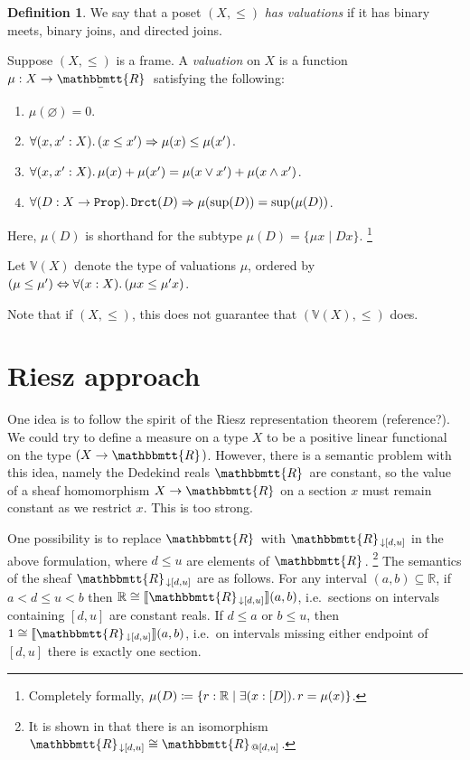 \documentclass[11pt, oneside, article]{memoir}
\makeatletter
\theoremstyle{plain}
\theoremstyle{definition}
\newtheorem{definition}[theorem]{Definition}
\theoremstyle{remark}
\renewcommand{\ss}{\subseteq}
\DeclarePairedDelimiter{\church}{\llbracket}{\rrbracket}
\DeclarePairedDelimiter{\subtype}{[}{]}
\newcommand{\const}[1]{\mathtt{#1}}
\newcommand{\ubar}[1]{\underaccent{\bar}{#1}}
\newcommand{\internal}[1]{\raisebox{-.03ex}{$\mathbbmtt{#1}$}}
\newcommand{\hs}{\hspace{1.1pt}}
\newcommand{\RR}{\mathbb{R}}
\newcommand{\VV}{\mathbb{V}}
\newcommand{\tRR}{\internal{R}\hs}
\newcommand{\tLR}{\ubar{\tRR}\hs}
\newcommand{\tRRat}[1]{\tRR_{\SeeInline{#1}}}
\newcommand{\Prop}{\const{Prop}}
\newcommand{\SeeSymbol}{{\down}}  %
\newcommand{\AtInline}[1]{@{#1}}
\newcommand{\SeeInline}[1]{\SeeSymbol{#1}}
\newcommand{\down}{\mathord{\downarrow}}
\newcommand{\imp}{\Rightarrow}
\renewcommand{\iff}{\Leftrightarrow}
\makeatother
\begin{document}
\begin{definition}
We say that a poset $(X,\leq)$ \emph{has valuations} if it has binary meets, binary joins, and directed joins.

Suppose $(X,\leq)$ is a frame. A \emph{valuation} on $X$ is a function $\mu:X\to\tLR$ satisfying the following:
\begin{enumerate}
	\item $\mu(\varnothing)=0$.
	\item $\forall(x,x':X)\ldotp(x\leq x')\imp\mu(x)\leq\mu(x')$.
	\item $\forall(x,x':X)\ldotp\mu(x)+\mu(x')=\mu(x\vee x')+\mu(x\wedge x')$.
	\item $\forall(D:X\to\Prop)\ldotp\const{Drct}(D)\imp \mu(\sup(D))=\sup(\mu(D))$.
\end{enumerate}
Here, $\mu(D)$ is shorthand for the subtype $\mu(D)=\{\mu x\mid Dx\}$.%
\footnote{Completely formally, $\mu(D)\coloneqq\{r:\RR\mid\exists(x:\subtype{D})\ldotp r=\mu(x)\}$.}

Let $\VV(X)$ denote the type of valuations $\mu$, ordered by $(\mu\leq\mu')\iff\forall(x:X)\ldotp(\mu x\leq \mu'x)$.
\end{definition}

Note that if $(X,\leq)$, this does not guarantee that $(\VV(X),\leq)$ does.

\chapter{Riesz approach}

One idea is to follow the spirit of the Riesz representation theorem (reference?). We could try to define a measure on a type $X$ to be a positive linear functional on the type $(X\to\tRR)$. However, there is a semantic problem with this idea, namely the Dedekind reals $\tRR$ are constant, so the value of a sheaf homomorphism $X\to\tRR$ on a section $x$ must remain constant as we restrict $x$. This is too strong.

One possibility is to replace $\tRR$ with $\tRRat{[d,u]}$ in the above formulation, where $d\leq u$ are elements of $\tRR$.%
\footnote{
It is shown in \cite[Prop 7.9]{Schultz.Spivak:2017a} that there is an isomorphism $\tRRat{[d,u]}\cong\tRR_{\AtInline{[d,u]}}$.
}
The semantics of the sheaf $\tRRat{[d,u]}$ are as follows. For any interval $(a,b)\ss\RR$, if $a<d\leq u<b$ then $\RR\cong\church{\tRRat{[d,u]}}(a,b)$, i.e.\ sections on intervals containing $[d,u]$ are constant reals. If $d\leq a$ or $b\leq u$, then $1\cong\church{\tRRat{[d,u]}}(a,b)$, i.e.\ on intervals missing either endpoint of $[d,u]$ there is exactly one section.
\end{document}
